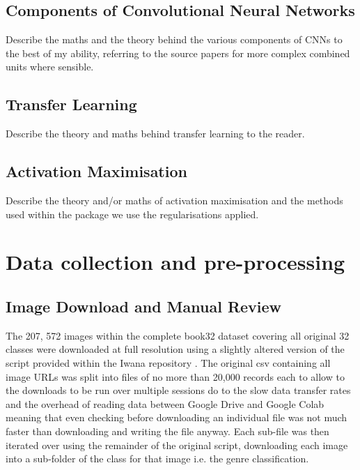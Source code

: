 \documentclass[12pt]{article}
\numberwithin{equation}{section}
\numberwithin{figure}{section}
\begin{document}
\subsection{Components of Convolutional Neural Networks} 
\label{sub:Components_of_Convolutional_Neural_Networks} 
Describe the maths and the theory behind the various components of CNNs to the best of my ability, referring to the source papers for more complex combined units where sensible. 
\subsection{Transfer Learning} 
\label{sub:Transfer_Learning} 
Describe the theory and maths behind transfer learning to the reader.

\subsection{Activation Maximisation} 
\label{sub:Activation_Maximisation} 
Describe the theory and/or maths of activation maximisation and the methods used within the package we use the regularisations applied. 
\section{Data collection and pre-processing} 
\label{sec:Data_collection_and_pre-processing} 
\subsection{Image Download and Manual Review} 
\label{sub:Image Download and Manual Review} 
The 207, 572 images within the complete book32 dataset covering all original 32 classes were downloaded at full resolution using a slightly altered version of the script provided within the Iwana repository \cite{iwanarepo}. The original csv containing all image URLs was split into files of no more than 20,000 records each to allow to the downloads to be run over multiple sessions do to the slow data transfer rates and the overhead of reading data between Google Drive and Google Colab meaning that even checking before downloading an individual file was not much faster than downloading and writing the file anyway. Each sub-file was then iterated over using the remainder of the original script, downloading each image into a sub-folder of the class for that image i.e. the genre classification.
\end{document}
